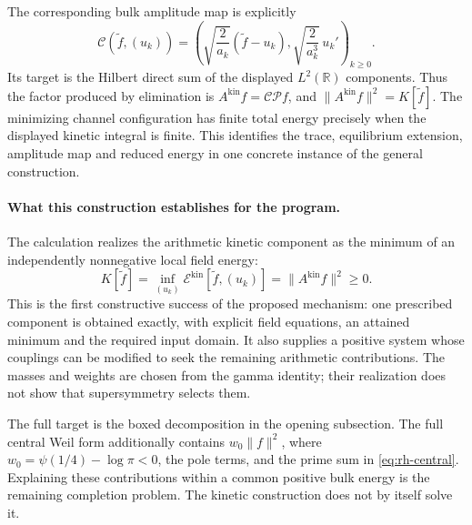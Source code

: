 The corresponding bulk amplitude map is explicitly
\[
\mathcal C(\widetilde f,(u_k))
=\left(
\sqrt{\frac2{a_k}}(\widetilde f-u_k),
\sqrt{\frac2{a_k^3}}\,u_k'
\right)_{k\geq0}.
\]
Its target is the Hilbert direct sum of the displayed $L^2(\mathbb R)$
components. Thus the factor produced by elimination is
$A^{\mathrm{kin}}f=\mathcal C\mathcal P f$, and
$\lVert A^{\mathrm{kin}}f\rVert^2=K[\widetilde f]$.
The minimizing channel configuration has finite total energy precisely
when the displayed kinetic integral is finite. This identifies the
trace, equilibrium extension, amplitude map and reduced energy in
one concrete instance of the general construction.

\paragraph{What this construction establishes for the program.}
The calculation realizes the arithmetic kinetic component as the
minimum of an independently nonnegative local field energy:
\[
\boxed{
K[\widetilde f]
=\inf_{(u_k)}\mathcal E^{\mathrm{kin}}[\widetilde f,(u_k)]
=\lVert A^{\mathrm{kin}}f\rVert^2\geq0.}
\]
This is the first constructive success of the proposed mechanism:
one prescribed component is obtained exactly, with explicit field
equations, an attained minimum and the required input domain. It
also supplies a positive system whose couplings can be modified to
seek the remaining arithmetic contributions. The masses and weights
are chosen from the gamma identity; their realization does not show
that supersymmetry selects them.

The full target is the boxed decomposition in the opening subsection.
The full central Weil form additionally contains
$w_0\lVert f\rVert^2$, where $w_0=\psi(1/4)-\log\pi<0$,
the pole terms, and the prime sum in \eqref{eq:rh-central}.
Explaining these contributions within a common positive bulk energy
is the remaining completion problem. The kinetic construction does
not by itself solve it.

